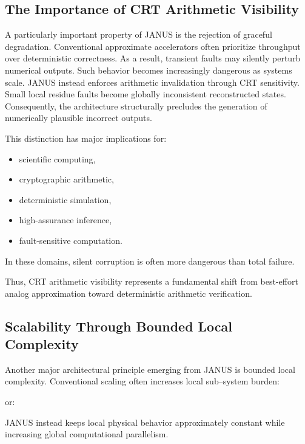\documentclass[journal]{IEEEtran}
\begin{document}
\subsection{\textbf{The Importance of CRT Arithmetic Visibility}}

A particularly important property of JANUS is the rejection of graceful degradation. Conventional approximate accelerators often prioritize throughput over deterministic correctness. As a result, transient faults may silently perturb numerical outputs. Such behavior becomes increasingly dangerous as systems scale. JANUS instead enforces arithmetic invalidation through CRT sensitivity. Small local residue faults become globally inconsistent reconstructed states. Consequently, the architecture structurally precludes the generation of numerically plausible incorrect outputs.

This distinction has major implications for:
\begin{itemize}
\item scientific computing,
\item cryptographic arithmetic,
\item deterministic simulation,
\item high-assurance inference,
\item fault-sensitive computation.
\end{itemize}

In these domains, silent corruption is often more dangerous than total failure.

Thus, CRT arithmetic visibility represents a fundamental shift from best-effort analog approximation toward deterministic arithmetic verification.

\subsection{\textbf{Scalability Through Bounded Local Complexity}}

Another major architectural principle emerging from JANUS is bounded local complexity. Conventional scaling often increases local sub--system burden:

\begin{center}
\end{center}
or:
\begin{center}
\end{center}

JANUS instead keeps local physical behavior approximately constant while increasing global computational parallelism.
\end{document}
